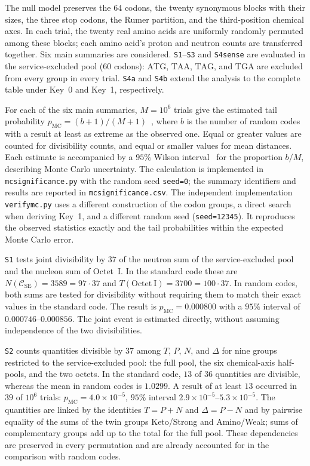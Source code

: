 \documentclass[11pt,a4paper]{article}
\renewcommand{\_}{\origunderscore\allowbreak}
\begin{document}
The null model preserves the $64$ codons, the twenty synonymous
blocks with their sizes, the three stop codons, the Rumer
partition, and the third-position chemical axes. In each trial,
the twenty real amino acids are uniformly randomly permuted
among these blocks; each amino acid's proton and neutron counts
are transferred together. Six main summaries are considered.
\texttt{S1}--\texttt{S3} and \texttt{S4sense} are evaluated in
the service-excluded pool ($60$ codons): $\mathrm{ATG}$,
$\mathrm{TAA}$, $\mathrm{TAG}$, and $\mathrm{TGA}$ are excluded
from every group in every trial. \texttt{S4a} and \texttt{S4b}
extend the analysis to the complete table under Key~0 and Key~1,
respectively.

For each of the six main summaries, $M=10^{6}$ trials give the estimated tail
probability $p_{\mathrm{MC}}=(b+1)/(M+1)$~\cite{north2002}, where $b$ is the
number of random codes with a result at least as extreme as
the observed one. Equal or greater values are counted for
divisibility counts, and equal or smaller values for mean
distances. Each estimate is accompanied by a $95\%$ Wilson
interval~\cite{wilson1927} for the proportion $b/M$, describing Monte Carlo uncertainty.
The calculation is implemented in \texttt{mc\_significance.py}
with the random seed \texttt{seed=0};
the summary identifiers and results are reported in
\texttt{mc\_significance.csv}. The independent implementation
\texttt{verify\_mc.py} uses a different construction of the
codon groups, a direct search when deriving Key~1, and a different
random seed (\texttt{seed=12345}). It reproduces the observed
statistics exactly and the tail probabilities within the expected
Monte Carlo error.

\texttt{S1} tests joint divisibility by $37$ of the neutron
sum of the service-excluded pool and the nucleon sum of
Octet~I. In the standard code these are
$N(\mathcal{C}_{\mathrm{SE}}) = 3589 = 97 \cdot 37$ and
$T(\mathrm{Octet~I}) = 3700 = 100 \cdot 37$.
In random codes, both sums are tested for divisibility without
requiring them to match their exact values in the standard code.
The result is $p_{\mathrm{MC}} = 0.000800$ with a $95\%$ interval
of $0.000746$--$0.000856$. The joint event is estimated directly,
without assuming independence of the two divisibilities.

\texttt{S2} counts quantities divisible by $37$ among $T$, $P$,
$N$, and $\Delta$ for nine groups restricted to the
service-excluded pool: the full pool, the six chemical-axis
half-pools, and the two octets. In the standard code, $13$ of
$36$ quantities are divisible, whereas the mean in random codes
is $1.0299$.
A result of at least $13$ occurred in $39$ of $10^{6}$ trials:
$p_{\mathrm{MC}} = 4.0 \times 10^{-5}$,
$95\%$ interval $2.9 \times 10^{-5}$--$5.3 \times 10^{-5}$.
The quantities are linked by the identities $T=P+N$ and
$\Delta=P-N$ and by pairwise equality of the sums of the twin
groups Keto/Strong and Amino/Weak; sums of complementary groups
add up to the total for the full pool. These dependencies are
preserved in every permutation and are already accounted for
in the comparison with random codes.
\end{document}
